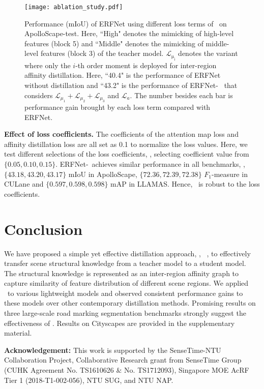 \documentclass[10pt,twocolumn,letterpaper]{article}
\begin{document}
\begin{figure}[t]
  \centering
  \texttt{[image: ablation\_study.pdf]}
\caption{Performance (mIoU) of ERFNet using different loss terms of \algorithmname~on ApolloScape-test. Here, ``High" denotes the mimicking of high-level features (block 5) and ``Middle" denotes the mimicking of middle-level features (block 3) of the teacher model. $\mathcal{L}_\mathrm{\mu_{i}}$ denotes the variant where only the $i$-th order moment is deployed for inter-region affinity distillation. Here, ``40.4" is the performance of ERFNet without distillation and ``43.2" is the performance of ERFNet-\algorithmname~ that considers $\mathcal{L}_{\mu_1}+\mathcal{L}_{\mu_2}+\mathcal{L}_{\mu_3}$ and $\mathcal{L}_{a}$. The number besides each bar is performance gain brought by each loss term compared with ERFNet.}
  \centering
  \vskip -0.7cm
  \label{fig:loss}
\end{figure}



\noindent \textbf{Effect of loss coefficients.} The coefficients of the attention map loss and affinity distillation loss are all set as 0.1 to normalize the loss values. Here, we test different selections of the loss coefficients, \ie, selecting coefficient value from $\{0.05, 0.10, 0.15\}$. ERFNet-\algorithmname~achieves similar performance in all benchmarks, \ie, $\{43.18, 43.20, 43.17\}$ mIoU in ApolloScape, $\{72.36, 72.39, 72.38\}$ $F_{1}$-measure in CULane and $\{0.597, 0.598, 0.598\}$ mAP in LLAMAS. Hence, \algorithmname~is robust to the loss coefficients.     




 
\section{Conclusion}\label{conclusion}

We have proposed a simple yet effective distillation approach, \ie, \algorithmname~, to effectively transfer scene structural knowledge from a teacher model to a student model. The structural knowledge is represented as an inter-region affinity graph to capture similarity of feature distribution of different scene regions. We applied \algorithmname~to various lightweight models and observed consistent performance gains to these models over other contemporary distillation methods. Promising results on three large-scale road marking segmentation benchmarks strongly suggest the effectiveness of \algorithmname. Results on Cityscapes are provided in the supplementary material. 

\noindent \textbf{Acknowledgement:} This work is supported by the SenseTime-NTU Collaboration Project, Collaborative Research grant from SenseTime Group (CUHK Agreement No. TS1610626 $\&$ No. TS1712093), Singapore MOE AcRF Tier 1 (2018-T1-002-056), NTU SUG, and NTU NAP.

{\small


}
\end{document}
